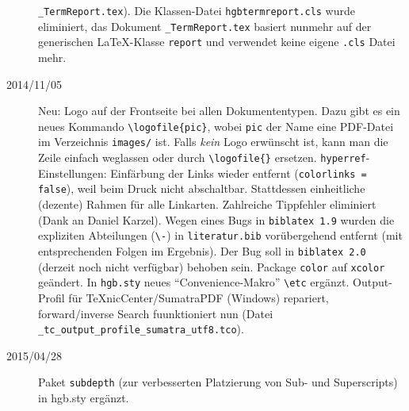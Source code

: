 \begin{sloppypar}
\begin{description}
\texttt{\_TermReport.tex}).
\newline
Die Klassen-Datei \texttt{hgbtermreport.cls} wurde eliminiert, das Dokument \texttt{\_TermReport.tex} basiert nunmehr
auf der generischen LaTeX-Klasse \texttt{report}  und verwendet keine eigene \texttt{.cls} Datei mehr.
%
\item[2014/11/05]
Neu: Logo auf der Frontseite bei allen Dokumententypen. Dazu gibt es ein neues Kommando
\verb!\logofile{pic}!, wobei \verb!pic! der Name eine PDF-Datei im
Verzeichnis \verb!images/! ist. Falls \emph{kein} Logo erwünscht ist, 
kann man die Zeile einfach weglassen oder durch \verb!\logofile{}! ersetzen.
\newline
\texttt{hyperref}-Einstellungen: Einfärbung der Links wieder entfernt (\texttt{colorlinks = false}), weil beim Druck
nicht abschaltbar. Stattdessen einheitliche (dezente) Rahmen für alle Linkarten.
Zahlreiche Tippfehler eliminiert (Dank an Daniel Karzel).
\newline
Wegen eines Bugs in \texttt{biblatex 1.9} wurden die expliziten Abteilungen (\verb!\-!) in \texttt{literatur.bib}
vorübergehend entfernt (mit entsprechenden Folgen im Ergebnis). Der Bug soll in \texttt{biblatex 2.0} (derzeit noch
nicht verfügbar) behoben sein.
\newline
Package \texttt{color} auf \texttt{xcolor} geändert. In \texttt{hgb.sty} neues "`Convenience-Makro"' \verb!\etc! ergänzt.
Output-Profil für TeXnicCenter/SumatraPDF (Windows) repariert, forward/inverse Search fuunktioniert nun
(Datei \verb!_tc_output_profile_sumatra_utf8.tco!).
%
\item[2015/04/28]
Paket \texttt{subdepth} (zur verbesserten Platzierung von Sub- und Superscripts) 
in hgb.sty ergänzt.
\end{description}

\end{sloppypar}









